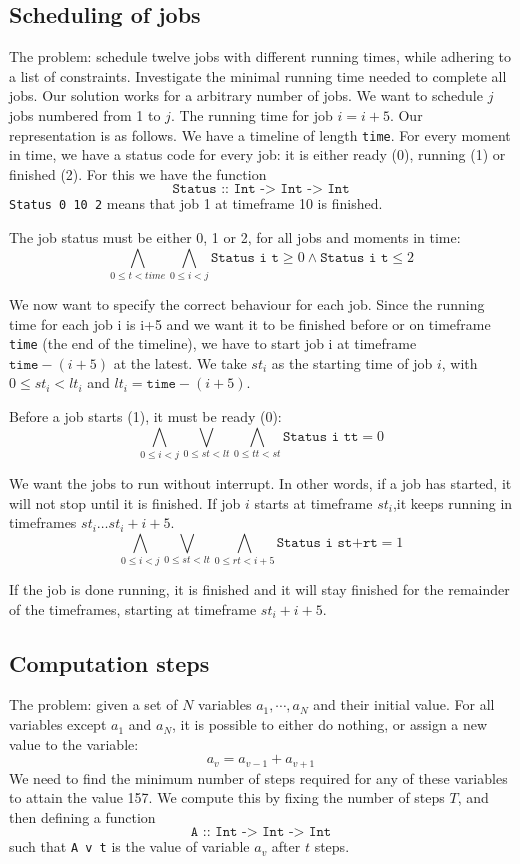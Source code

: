 \documentclass[12pt]{article}
\begin{document}
\subsection*{Scheduling of jobs}
The problem: schedule twelve jobs with different running times, while adhering to a list of constraints. Investigate the minimal running time needed to complete all jobs.
Our solution works for a arbitrary number of jobs. We want to schedule $j$ jobs numbered from 1 to $j$. The running time for job $i = i+5$.
Our representation is as follows. We have a timeline of length \texttt{time}. For every moment in time, we have a status code for every job: it is either ready (0), running (1) or finished (2). 
For this we have the function 
\[\texttt{Status :: Int -> Int -> Int}\]
\texttt{Status 0 10 2} means that job 1 at timeframe 10 is finished. 

The job status must be either 0, 1 or 2, for all jobs and moments in time:
\[ \bigwedge_{0 \le t < time} \bigwedge_{0 \le i < j} \texttt{Status i t} \ge 0\wedge \texttt{Status i t} \le 2\]

We now want to specify the correct behaviour for each job. 
Since the running time for each job i is i+5 and we want it to be finished before or on timeframe \texttt{time} (the end of the timeline), we have to start job i at timeframe $\texttt{time}-(i+5)$ at the latest.
We take $st_i$ as the starting time of job $i$, with $0 \le st_i < lt_i$ and $lt_i = \texttt{time}-(i+5)$.

Before a job starts (1), it must be ready (0):
\[ \bigwedge_{0 \le i < j} \bigvee_{0 \le st < lt} \bigwedge_{0 \le tt < st} \texttt{Status i tt} = 0 \]

We want the jobs to run without interrupt.
In other words, if a job has started, it will not stop until it is finished. 
If job $i$ starts at timeframe $st_i$,it keeps running in timeframes $st_i \dots st_i + i + 5$.
\[ \bigwedge_{0 \le i < j} \bigvee_{0 \le st < lt} \bigwedge_{0 \le rt < i+5} \texttt{Status i st+rt} = 1 \]

If the job is done running, it is finished and it will stay finished for the remainder of the timeframes, starting at timeframe $st_i + i + 5$.


\subsection*{Computation steps}
The problem: given a set of $N$ variables $a_1, \cdots, a_N$ and their initial value.
For all variables except $a_1$ and $a_N$, it is possible to either do nothing, or assign a new value to the variable:
\[ a_v = a_{v-1} + a_{v+1} \]
We need to find the minimum number of steps required for any of these variables to attain the value 157.
We compute this by fixing the number of steps $T$, and then defining a function
\[\texttt{A :: Int -> Int -> Int}\]
such that \texttt{A v t} is the value of variable $a_v$ after $t$ steps.
\end{document}
